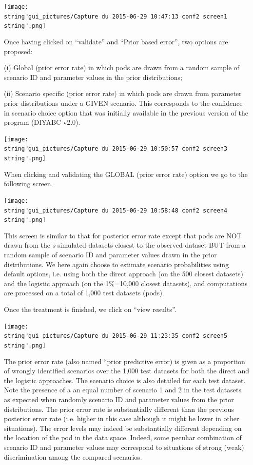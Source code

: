 \texttt{[image: \\string"gui\_pictures/Capture du 2015-06-29 10:47:13 conf2 screen1\\string".png]}

Once having clicked on ``validate'' and ``Prior based error'',
two options are proposed:

(i) Global (prior error rate) in which pods are drawn from a random
sample of scenario ID and parameter values in the prior distributions;

(ii) Scenario specific (prior error rate) in which pods are drawn
from parameter prior distributions under a GIVEN scenario. This corresponds
to the confidence in scenario choice option that was initially available
in the previous version of the program (DIYABC v2.0).

\texttt{[image: \\string"gui\_pictures/Capture du 2015-06-29 10:50:57 conf2 screen3\\string".png]}

When clicking and validating the GLOBAL (prior error rate) option
we go to the following screen.

\texttt{[image: \\string"gui\_pictures/Capture du 2015-06-29 10:58:48 conf2 screen4\\string".png]}

This screen is similar to that for posterior error rate except that
pods are NOT drawn from the \textit{s} simulated datasets closest
to the observed dataset BUT from a random sample of scenario ID and
parameter values drawn in the prior distributions. We here again choose
to estimate scenario probabilities using default options, i.e. using
both the direct approach (on the 500 closest datasets) and the logistic
approach (on the 1\%=10,000 closest datasets), and computations are
processed on a total of 1,000 test datasets (pods).

Once the treatment is finished, we click on ``view results''.

\texttt{[image: \\string"gui\_pictures/Capture du 2015-06-29 11:23:35 conf2 screen5\\string".png]}

The prior error rate (also named ``prior predictive error) is given
as a proportion of wrongly identified scenarios over the 1,000 test
datasets for both the direct and the logistic approaches. The scenario
choice is also detailed for each test dataset. Note the presence of
a an equal number of scenario 1 and 2 in the test datasets as expected
when randomly scenario ID and parameter values from the prior distributions.
The prior error rate is substantially different than the previous
posterior error rate (i.e. higher in this case although it might be
lower in other situations). The error levels may indeed be substantially
different depending on the location of the pod in the data space.
Indeed, some peculiar combination of scenario ID and parameter values
may correspond to situations of strong (weak) discrimination among
the compared scenarios.

